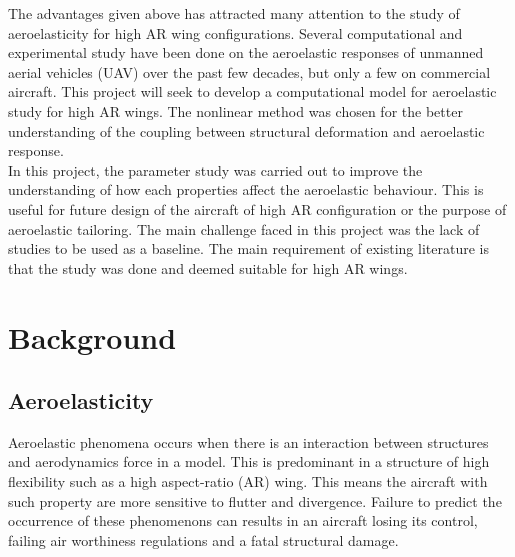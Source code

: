 \documentclass[11pt]{article}
\begin{document}
The advantages given above has attracted many attention to the study of aeroelasticity for high AR wing configurations. Several computational and experimental study have been done on the aeroelastic responses of unmanned aerial vehicles (UAV) over the past few decades, but only a few on commercial aircraft. This project will seek to develop a computational model for aeroelastic study for high AR wings. The nonlinear method was chosen for the better understanding of the coupling between structural deformation and aeroelastic response.\\

In this project, the parameter study was carried out to improve the understanding of how each properties affect the aeroelastic behaviour. This is useful for future design of the aircraft of high AR configuration or the purpose of aeroelastic tailoring. The main challenge faced in this project was the lack of studies to be used as a baseline. The main requirement of existing literature is that the study was done and deemed suitable for high AR wings.

\section{Background}
\label{sec:background}

\subsection{Aeroelasticity}
Aeroelastic phenomena occurs when there is an interaction between structures and aerodynamics force in a model. This is predominant in a structure of high flexibility such as a high aspect-ratio (AR) wing. This means the aircraft with such property are more sensitive to flutter and divergence. Failure to predict the occurrence of these phenomenons can results in an aircraft losing its control, failing air worthiness regulations and a fatal structural damage.\\
\end{document}
